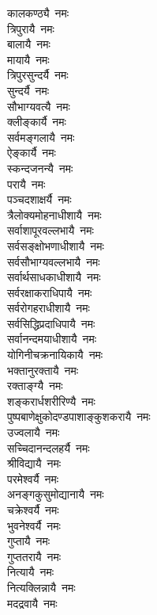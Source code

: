 \begin{multicols}{2}
\begin{flushleft}
कालकण्ठ्यै~नमः\\
त्रिपुरायै~नमः\\
बालायै~नमः\\
मायायै~नमः\\
त्रिपुरसुन्दर्यै~नमः\\
सुन्दर्यै~नमः\\
सौभाग्यवत्यै~नमः\\
क्लीङ्कार्यै~नमः\\
सर्वमङ्गलायै~नमः\\
ऐङ्कार्यै~नमः \hfill{}\\
स्कन्दजनन्यै~नमः\\
परायै~नमः\\
पञ्चदशाक्षर्यै~नमः\\
त्रैलोक्यमोहनाधी\-शायै~नमः\\
सर्वाशापूरवल्लभायै~नमः\\
सर्वसङ्क्षोभणाधीशायै~नमः\\
सर्वसौभाग्यवल्लभायै~नमः\\
सर्वार्थसाधकाधीशायै~नमः\\
सर्वरक्षाकराधिपायै~नमः\\
सर्वरोगहराधीशायै~नमः \hfill{}\\
सर्वसिद्धिप्रदाधिपायै~नमः\\
सर्वानन्दमयाधीशायै~नमः\\
योगिनीचक्रनायिकायै~नमः\\
भक्तानुरक्तायै~नमः\\
रक्ताङ्ग्यै~नमः\\
शङ्करार्धशरीरिण्यै~नमः\\
पुष्पबाणेक्षु\-कोदण्ड\-पाशा\-ङ्कुश\-करायै~नमः\\
उज्वलायै~नमः\\
सच्चिदानन्दलहर्यै~नमः\\
श्रीविद्यायै~नमः \hfill{}\\
परमेश्वर्यै~नमः\\
अनङ्गकुसुमोद्यानायै~नमः\\
चक्रेश्वर्यै~नमः\\
भुवनेश्वर्यै~नमः\\
गुप्तायै~नमः\\
गुप्ततरायै~नमः\\
नित्यायै~नमः\\
नित्यक्लिन्नायै~नमः\\
मदद्रवायै~नमः\\

\end{flushleft}
\end{multicols}
